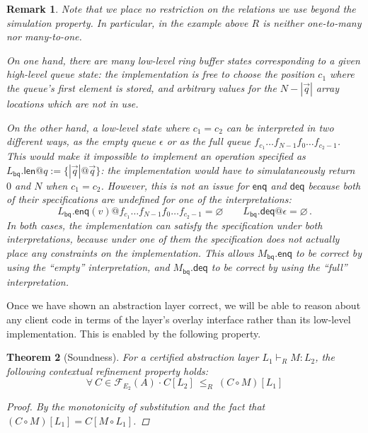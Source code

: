 \documentclass[draft,11pt]{report}
\newtheorem{theorem}{Theorem}[chapter]
\newtheorem{remark}[theorem]{Remark}
\theoremstyle{definition}
\newcommand{\kw}[1]{\ensuremath{ \mathsf{#1} }}
\newcommand{\bdot}{\boldsymbol{\cdot}}
\begin{document}
\begin{remark}
Note that we place no restriction
on the relations we use
beyond the simulation property.
In particular, in the example above
$R$ is neither one-to-many nor many-to-one.

On one hand,
there are many low-level ring buffer states corresponding to
a given high-level queue state:
the implementation is free to choose the position $c_1$
where the queue's first element is stored,
and arbitrary values for the $N - |\vec{q}|$
array locations which are not in use.

On the other hand,
a low-level state where $c_1 = c_2$
can be interpreted in two different ways,
as the empty queue $\epsilon$ or
as the full queue $f_{c_1} \ldots f_{N-1} f_0 \ldots f_{c_2 - 1}$.
This would make it impossible to implement
an operation specified as
$L_\kw{bq}.\kw{len}@q := \{ |\vec{q}|@\vec{q} \}$:
the implementation
would have to simulataneously
return $0$ and $N$
when $c_1 = c_2$.
However,
this is not an issue for $\kw{enq}$ and $\kw{deq}$ because
both of their specifications are undefined
for one of the interpretations:
\[
  L_\kw{bq}.\kw{enq}(v)@f_{c_1} \ldots f_{N-1} f_0 \ldots f_{c_2 - 1}
  =
  \varnothing
  \qquad
  L_\kw{bq}.\kw{deq}@\epsilon
  =
  \varnothing
  \,.
\]
In both cases,
the implementation can satisfy the specification
under both interpretations,
because under one of them
the specification does not actually place
any constraints on the implementation.
This allows
$M_\kw{bq}.\kw{enq}$ to be correct
by using the ``empty'' interpretation, and
$M_\kw{bq}.\kw{deq}$ to be correct
by using the ``full'' interpretation.
\end{remark}

Once we have shown an abstraction layer correct,
we will be able to reason about any client code
in terms of the layer's overlay interface
rather than its low-level implementation.
This is enabled by the following property.

\begin{theorem}[Soundness]
For a certified abstraction layer $L_1 \vdash_R M : L_2$,
the following \emph{contextual refinement} property holds:
\[
  \forall \: C \in \mathcal{F}_{E_2}(A) \: \bdot \:
  C[L_2] \: \le_R \: (C \circ M)[L_1]
\]
\begin{proof}
By the monotonicity of substitution and the fact that
$(C \circ M)[L_1] = C[M \circ L_1]$.
\end{proof}
\end{theorem}

\end{document}
